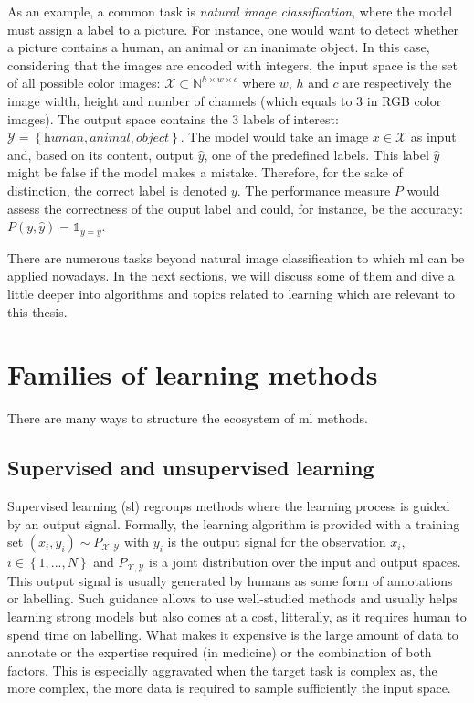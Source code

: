 As an example, a common task is \textit{natural image classification}, where the model must assign a label to a picture. For instance, one would want to detect whether a picture contains a human, an animal or an inanimate object. In this case, considering that the images are encoded with integers, the input space is the set of all possible color images: $\mathcal{X} \subset \mathbb{N}^{h\times w\times c}$ where $w$, $h$ and $c$ are respectively the image width, height and number of channels (which equals to 3 in RGB color images). The output space contains the 3 labels of interest: $\mathcal{Y} = \left\{\textit{human}, \textit{animal}, \textit{object}\right\}$. The model would take an image $x \in \mathcal{X}$ as input and, based on its content, output $\hat{y}$, one of the predefined labels. This label $\hat{y}$ might be false if the model makes a mistake. Therefore, for the sake of distinction, the correct label is denoted $y$. The performance measure $P$ would assess the correctness of the ouput label and could, for instance, be the accuracy: $P(y, \hat{y}) = \mathbb{1}_{y=\hat{y}}$.

There are numerous tasks beyond natural image classification to which \acrlong{ml} can be applied nowadays. In the next sections, we will discuss some of them and dive a little deeper into algorithms and topics related to learning which are relevant to this thesis.


\section{Families of learning methods}
\label{sec:backml:families}

There are many ways to structure the ecosystem of \acrlong{ml} methods. 

\subsection{Supervised and unsupervised learning}
\label{ssec:backmk:supvsunsup}

Supervised learning (\acrshort{sl}) regroups methods where the learning process is guided by an output signal. Formally, the learning algorithm is provided with a training set $(x_i, y_i) \sim P_{\mathcal{X},\mathcal{Y}}$ with $y_i$ is the output signal for the observation $x_i$, $i \in \left\{1,...,N\right\}$ and $P_{\mathcal{X},\mathcal{Y}}$ is a joint distribution over the input and output spaces. This output signal is usually generated by humans as some form of annotations or labelling. Such guidance allows to use well-studied methods and usually helps learning strong models but also comes at a cost, litterally, as it requires human to spend time on labelling. What makes it expensive is the large amount of data to annotate or the expertise required (\eg in medicine) or the combination of both factors. This is especially aggravated when the target task is complex as, the more complex, the more data is required to sample sufficiently the input space.  

